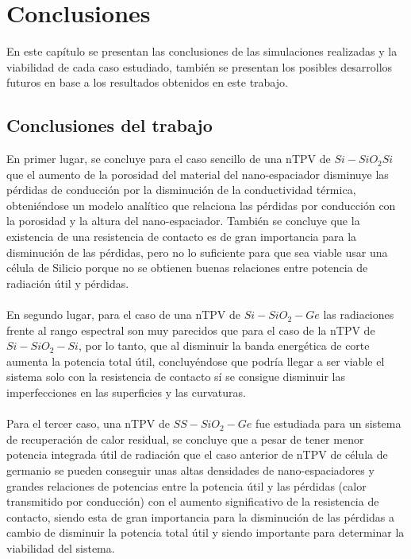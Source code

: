 \chapter{Conclusiones}
En este capítulo se presentan las conclusiones de las simulaciones realizadas y la viabilidad de cada caso estudiado, también se presentan los posibles desarrollos futuros en base a los resultados obtenidos en este trabajo.

\section{Conclusiones del trabajo}
En primer lugar, se concluye para el caso sencillo de una nTPV de $Si-SiO_2Si$ que el aumento de la porosidad del material del nano-espaciador disminuye las pérdidas de conducción por la disminución de la conductividad térmica, obteniéndose un modelo analítico que relaciona las pérdidas por conducción con la porosidad y la altura del nano-espaciador. También se concluye que la existencia de una resistencia de contacto es de gran importancia para la disminución de las pérdidas, pero no lo suficiente para que sea viable usar una célula de Silicio porque no se obtienen buenas relaciones entre potencia de radiación útil y pérdidas.\\\\
En segundo lugar, para el caso de una nTPV de $Si-SiO_2-Ge$ las radiaciones frente al rango espectral son muy parecidos que para el caso de la nTPV de $Si-SiO_2-Si$, por lo tanto, que al disminuir la banda energética de corte aumenta la potencia total útil, concluyéndose que podría llegar a ser viable el sistema solo con la resistencia de contacto sí se consigue disminuir las imperfecciones en las superficies y las curvaturas.\\\\
Para el tercer caso, una nTPV de $SS-SiO_2-Ge$ fue estudiada para un sistema de recuperación de calor residual, se concluye que a pesar de tener menor potencia integrada útil de radiación que el caso anterior de nTPV de célula de germanio se pueden conseguir unas altas densidades de nano-espaciadores y grandes relaciones de potencias entre la potencia útil y las pérdidas (calor transmitido por conducción) con el aumento significativo de la resistencia de contacto, siendo esta de gran importancia para la disminución de las pérdidas a cambio de disminuir la potencia total útil y siendo importante para determinar la viabilidad del sistema.\\\\
